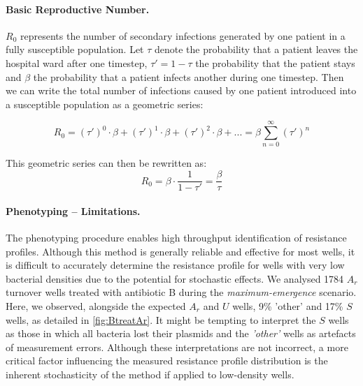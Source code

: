 \paragraph{Basic Reproductive Number.}
$R_0$ represents the number of secondary infections generated by one patient in a fully susceptible population.
Let $\tau$ denote the probability that a patient leaves the hospital ward after one timestep,  $\tau' = 1 - \tau$ the probability that the patient stays and $\beta$ the probability that a patient infects another during one timestep.
Then we can write the total number of infections caused by one patient introduced into a susceptible population as a geometric series:

\begin{equation*}
R_0 = (\tau')^0 \cdot \beta + (\tau')^1 \cdot \beta + (\tau')^2 \cdot \beta + ... = \beta \sum_{n=0}^{\infty} (\tau')^n
\end{equation*}

This geometric series can then be rewritten as:
\begin{equation}
R_0 = \beta \cdot \frac{1}{1 - \tau'} = \frac{\beta}{\tau} \label{eq:R0}
\end{equation}

\paragraph{Phenotyping -- Limitations. \label{par:x_phenotyping}}
The phenotyping procedure enables high throughput identification of resistance profiles.
Although this method is generally reliable and effective for most wells, it is difficult to accurately determine the resistance profile for wells with very low bacterial densities due to the potential for stochastic effects.
We analysed 1784 \( A_r \) turnover wells treated with antibiotic B during the \textit{maximum-emergence} scenario.
Here, we observed, alongside the expected $A_r$ and $U$ wells, 9\% 'other' and 17\% \( S \) wells, as detailed in \autoref{fig:BtreatAr}.
It might be tempting to interpret the \( S \) wells as those in which all bacteria lost their plasmids and the \textit{'other'} wells as artefacts of measurement errors.
Although these interpretations are not incorrect, a more critical factor influencing the measured resistance profile distribution is the inherent stochasticity of the method if applied to low-density wells.

